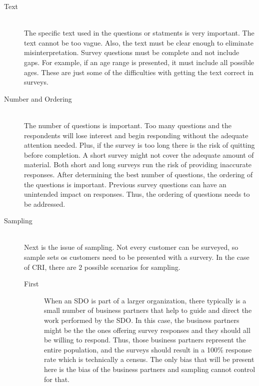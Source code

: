 \documentclass[SDSUThesis.tex]{subfiles}
\begin{document}
                \begin{description}
                \item[Text] \hfill \\
                    The specific text used in the questions or statments
                    is very important.  The text cannot be too vague.  Also, the text
                    must be clear enough to eliminate misinterpretation. Survey
                    questions must be complete and not include gaps.  For example, if
                    an age range is presented, it must include all possible ages.  These
                    are just some of the difficulties with getting the text correct
                    in surveys. 
                \item[Number and Ordering] \hfill \\
                    The number of questions is important.  Too many questions and the 
                    respondents will lose interest and begin responding without the
                    adequate attention needed.  Plus, if the survey is too long there
                    is the risk of quitting before completion.  A short survey might
                    not cover the adequate amount of material.  Both short and long
                    surveys run the risk of providing inaccurate responses.  After
                    determining the best number of questions, the ordering of the questions
                    is important.  Previous survey questions can have an unintended 
                    impact on responses.  Thus, the ordering of questions needs to be
                    addressed. 
                \item[Sampling] \hfill \\
                    Next is the issue of sampling.  Not every customer can be surveyed, so 
                    sample sets os customers need to be presented with a survery.  
                    In the case of CRI, there are 2 possible scenarios for sampling.  
                    \begin{description}
                    \item[First]
                    When an SDO is part of a larger organization, there typically is
                    a small number of business partners that help to guide and 
                    direct the work performed by the SDO.  In this case, the business 
                    partners might be the the ones offering survey responses and they 
                    should all be willing to respond.  Thus, those business partners 
                    represent the entire population, and the surveys should result in 
                    a 100\% response rate which is technically a census.  
                    The only bias that will be present here is the bias of the business 
                    partners and sampling cannot control for that.
           

\end{description}
\end{description}
\end{document}
